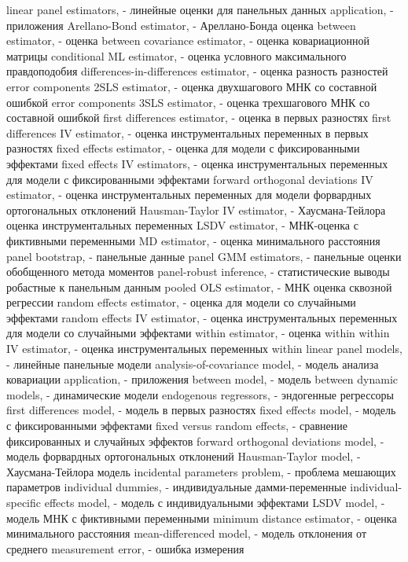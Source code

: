 linear panel estimators, - линейные оценки для панельных данных
application, - приложения
Arellano-Bond estimator, - Ареллано-Бонда оценка
between estimator, - оценка between
covariance estimator, - оценка ковариационной матрицы
conditional ML estimator, - оценка условного максимального правдоподобия
differences-in-differences estimator, - оценка разность разностей
error components 2SLS estimator,  - оценка двухшагового МНК со составной ошибкой
error components 3SLS estimator, - оценка трехшагового МНК со составной ошибкой
first differences estimator, - оценка в первых разностях
first differences IV estimator, - оценка инструментальных переменных в первых разностях
fixed effects estimator, - оценка для модели с фиксированными эффектами
fixed effects IV estimators, - оценка инструментальных переменных для модели с фиксированными эффектами
forward orthogonal deviations IV estimator, - оценка инструментальных переменных для модели форвардных ортогональных отклонений
Hausman-Taylor IV estimator, - Хаусмана-Тейлора оценка инструментальных переменных
LSDV estimator, - МНК-оценка с фиктивными переменными
MD estimator, - оценка минимального расстояния
panel bootstrap, - панельные данные
panel GMM estimators, - панельные оценки обобщенного метода моментов
panel-robust inference, - статистические выводы робастные к панельным данным
pooled OLS estimator, - МНК оценка сквозной регрессии
random effects estimator, - оценка для модели со случайными эффектами
random effects IV estimator, - оценка инструментальных переменных для модели со случайными эффектами
within estimator, - оценка within
within IV estimator, - оценка инструментальных переменных within 
linear panel models, - линейные панельные модели
analysis-of-covariance model, - модель анализа ковариации
application, - приложения
between model, - модель between
dynamic models, - динамические модели
endogenous regressors, - эндогенные регрессоры
first differences model, - модель в первых разностях
fixed effects model, - модель с фиксированными эффектами
fixed versus random effects, - сравнение фиксированных и случайных эффектов
forward orthogonal deviations model, - модель форвардных ортогональных отклонений
Hausman-Taylor model, - Хаусмана-Тейлора модель
incidental parameters problem, - проблема мешающих параметров
individual dummies, - индивидуальные дамми-переменные
individual-specific effects model, - модель с индивидуальными эффектами
LSDV model, - модель МНК с фиктивными переменными
minimum distance estimator, - оценка минимального расстояния
mean-differenced model, - модель отклонения от среднего
measurement error, - ошибка измерения
